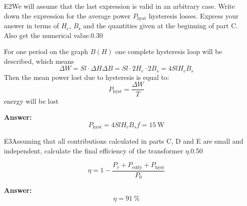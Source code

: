 \documentclass[11pt,a4paper]{article}
\begin{document}
\begin{solcard}{E2}{We will assume that the last expression is valid in an arbitrary case. Write down the expression for the average power $P_{\mathrm{hyst}}$ hysteresis losses. Express your answer in terms of $H_\mathrm c$, $B_\mathrm s$ and the quantities given at the beginning of part C. Also get the numerical value.}{0.30}

For one period on the graph $B(H)$ one complete hysteresis loop will be described, which means $$\Delta W = Sl\cdot\Delta H \Delta B = Sl\cdot2H_c\cdot2B_s = 4SlH_cB_s$$Then the mean power lost due to hysteresis is equal to: $$P_\mathrm{hyst} = \frac{\Delta W}{T}$$ energy will be lost

\par\smallskip\noindent\textbf{Answer:} $$ P_\mathrm{hyst} = 4SlH_cB_sf= 15~ \text{W} $$
\end{solcard}

\begin{solcard}{E3}{Assuming that all contributions calculated in parts C, D and E are small and independent, calculate the final efficiency of the transformer $\eta$.}{0.50}

$$\eta = 1-\frac{P_r+P_\mathrm{eddy}+P_\mathrm{hyst}}{P_0}$$

\par\smallskip\noindent\textbf{Answer:} $$\eta = 91~\%$$
\end{solcard}
\end{document}
